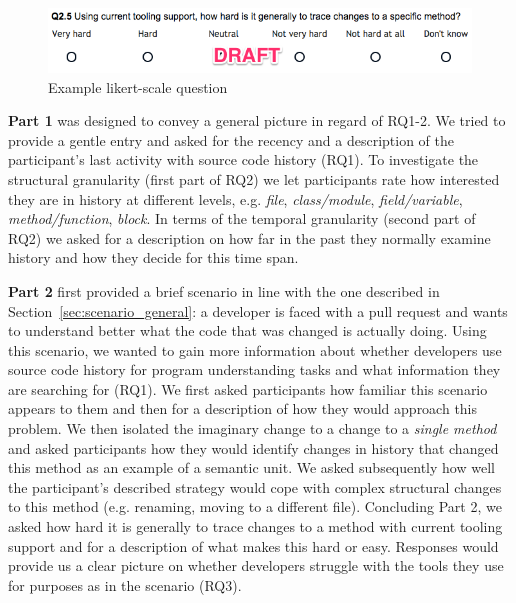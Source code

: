 \begin{figure}[t!]
  \includegraphics[width=0.98\columnwidth]{figures/example_likert_question}
  \caption{Example likert-scale question}
  \label{fig:example_likert_question}
\end{figure}

\textbf{Part 1} was designed to convey a general picture in regard of RQ1-2. We tried to provide a gentle entry and asked for the recency and a description of the participant's last activity with source code history (RQ1). To investigate the structural granularity (first part of RQ2) we let participants rate how interested they are in history at different levels, e.g. \textit{file}, \textit{class/module}, \textit{field/variable}, \textit{method/function}, \textit{block}. In terms of the temporal granularity (second part of RQ2) we asked for a description on how far in the past they normally examine history and how they decide for this time span.

\textbf{Part 2} first provided a brief scenario in line with the one described in Section~\ref{sec:scenario_general}: a developer is faced with a pull request and wants to understand better what the code that was changed is actually doing. Using this scenario, we wanted to gain more information about whether developers use source code history for program understanding tasks and what information they are searching for (RQ1). We first asked participants how familiar this scenario appears to them and then for a description of how they would approach this problem. We then isolated the imaginary change to a change to a \textit{single method} and asked participants how they would identify changes in history that changed this method as an example of a semantic unit. We asked subsequently how well the participant's described strategy would cope with complex structural changes to this method (e.g. renaming, moving to a different file). Concluding Part 2, we asked how hard it is generally to trace changes to a method with current tooling support and for a description of what makes this hard or easy. Responses would provide us a clear picture on whether developers struggle with the tools they use for purposes as in the scenario (RQ3).

